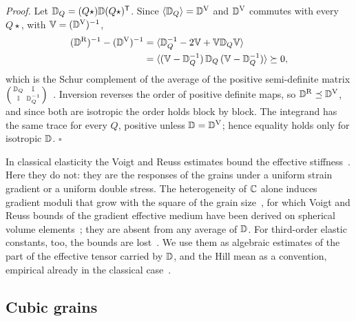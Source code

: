 \emph{Proof.} Let $\mathbb{D}_Q=(Q\star)\mathbb{D}(Q\star)^{\mathsf T}$. Since $\langle \mathbb{D}_Q\rangle=\mathbb{D}^{\mathrm{V}}$ and
$\mathbb{D}^{\mathrm{V}}$ commutes with every $Q\star$, with $\mathbb V=(\mathbb{D}^{\mathrm{V}})^{-1}$,
\begin{equation}
\begin{aligned}
(\mathbb{D}^{\mathrm{R}})^{-1}-(\mathbb{D}^{\mathrm{V}})^{-1}
&=\langle \mathbb{D}_Q^{-1}-2\mathbb V+\mathbb V\mathbb{D}_Q\mathbb V\rangle\\
&=\langle (\mathbb V-\mathbb{D}_Q^{-1})\,\mathbb{D}_Q\,(\mathbb V-\mathbb{D}_Q^{-1})\rangle\succeq0,
\end{aligned}
\label{eq:reuss-below-voigt}
\end{equation}
which is the Schur complement of the average of the positive semi-definite matrix
$\left(\begin{smallmatrix}\mathbb{D}_Q&\mathbb{I}\\\mathbb{I}&\mathbb{D}_Q^{-1}\end{smallmatrix}\right)$~\cite[theorem~1.3.3]{Bhatia2007}.
Inversion reverses the order of positive definite maps, so $\mathbb{D}^{\mathrm{R}}\preceq\mathbb{D}^{\mathrm{V}}$, and
since both are isotropic the order holds block by block. The integrand has the same trace for every
$Q$, positive unless $\mathbb{D}=\mathbb{D}^{\mathrm{V}}$; hence equality holds only for isotropic $\mathbb{D}$.
$\square$

In classical elasticity the Voigt and Reuss estimates bound the effective
stiffness~\cite{Blaschke2017,Kube2016}. Here they do not: they are the responses of the
grains under a uniform strain gradient or a uniform double stress. The heterogeneity
of $\mathbb{C}$ alone induces gradient moduli that grow with the square of the grain
size~\cite{Malyi2021}, for which Voigt and Reuss bounds of the gradient effective medium
have been derived on spherical volume elements~\cite{Muhlich2012}; they are absent
from any average of $\mathbb{D}$. For third-order elastic
constants, too, the bounds are lost~\cite{Blaschke2017}. We use them as algebraic
estimates of the part of the effective tensor carried by $\mathbb{D}$, and the Hill mean as a
convention, empirical already in the classical case~\cite{Kube2016}.

\subsection{Cubic grains}\label{sec:averages-cubic}

